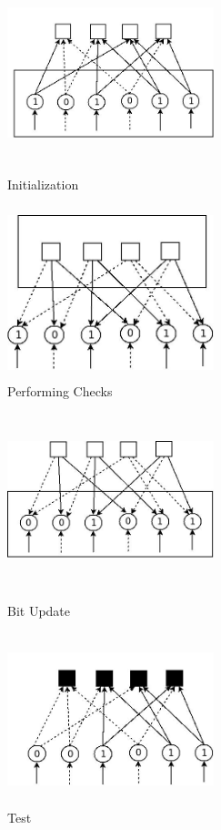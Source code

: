 \documentclass[twopage,12pt,a4paper]{report}
\begin{document}
\begin{raggedright}
\begin{figure}[h]
  \centering
  \begin{minipage}[b]{0.45\textwidth}
    \includegraphics[height=5cm,width=6cm]{initialization}
    \caption{Initialization}
  \end{minipage}
  \hspace{4mm}
  \begin{minipage}[b]{0.45\textwidth}
    \includegraphics[height=5cm,width=6cm]{PerCheck}
    \caption{Performing Checks}
  \end{minipage}
\end{figure}    

 \begin{figure}[h]
  \centering
  \begin{minipage}[b]{0.45\textwidth}
    \includegraphics[height=5cm,width=6cm]{BitUpdate}
    \caption{Bit Update}
  \end{minipage}
  \hspace{2mm}
  \begin{minipage}[b]{0.45\textwidth}
    \includegraphics[height=5cm,width=6cm]{Test}
    \caption{Test}
  \end{minipage}
\end{figure}   
 

\end{raggedright}
\end{document}
